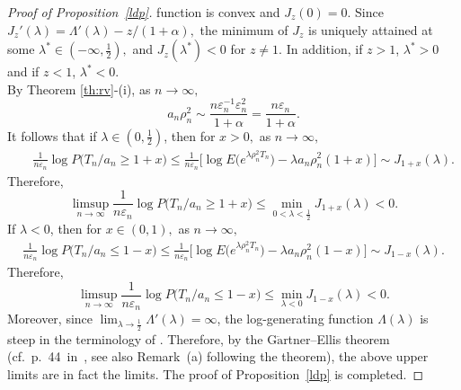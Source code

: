 \documentclass[12pt]{amsart}
\begin{document}
\begin{proof}[Proof of Proposition~\ref{ldp}]
function is convex and $J_z(0)=0$.  Since $J_z'(\lambda) =
\Lambda'(\lambda)-z/(1+\alpha),$ the minimum of $J_z$ is
uniquely attained at some $\lambda^* \in (-\infty,\frac 12),$ and
$J_z(\lambda^*)<0$ for $z\neq 1.$  In addition, if $z >1$, $\lambda^*>0$ and if
$z<1$, $\lambda^*<0$. \\
By Theorem \ref{th:rv}-(i), as $n\to\infty,$ $$a_n \rho_n^2 \sim \frac{n {\varepsilon}_n^{-1} {\varepsilon}_n^2}{1+\alpha}=\frac{n
{\varepsilon}_n}{1+\alpha}.$$ It follows that if  $\lambda \in (0,\frac 12)$, then for $x>0,$ as $n\to \infty,$
\begin{eqnarray*}
&&
{\frac {\displaystyle {1}}{\displaystyle {n{\varepsilon}_n} }} \log P\bigl(T_n/a_n\geq 1+x)
\le \frac{1}{n{\varepsilon}_n}\bigl[ \log E \bigl(e^{ \lambda
\rho_n^2 T_n}\bigr) - \lambda a_n \rho_n^2 (1+x)\bigr]\sim J_{1+x}(\lambda).
\end{eqnarray*}
Therefore,
$$\limsup_{n\to\infty} {\frac {\displaystyle {1}}{\displaystyle {n{\varepsilon}_n} }} \log P\bigl(T_n/a_n\geq
1+x)\le \min_{0<\lambda < \frac 12} J_{1+x}(\lambda)<0.$$
If $\lambda <0$, then for $x\in (0,1),$  as $n\to\infty,$
\begin{eqnarray*}
{\frac {\displaystyle {1}}{\displaystyle {n{\varepsilon}_n} }} \log P\bigl(T_n/a_n\leq 1-x) \le \frac{1}{n{\varepsilon}_n}\bigl[ \log
E \bigl(e^{ \lambda \rho_n^2 T_n}\bigr) - \lambda a_n \rho_n^2 (1-x) \bigr]\sim J_{1-x}(\lambda).
\end{eqnarray*}
Therefore,
$$\limsup_{n\to\infty} {\frac {\displaystyle {1}}{\displaystyle {n {\varepsilon}_n } }} \log P\bigl(T_n/a_n\leq 1-x \bigr)
\leq \min_{\lambda < 0} J_{1-x} (\lambda)<0.$$
Moreover, since $\lim_{\lambda\to \frac 12} \Lambda'(\lambda) =\infty$, the log-generating function $\Lambda(\lambda)$ is steep in the terminology of
\cite{ldpb}. Therefore, by the G$\ddot{\mbox{a}}$rtner--Ellis theorem (cf.~p.~44~in~\cite{ldpb}, see also Remark~(a) following
the theorem), the above upper limits are in fact the limits. The proof of Proposition~\ref{ldp} is completed.
\end{proof}
\end{document}
